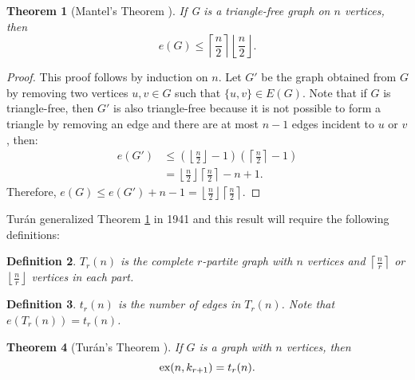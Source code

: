 \documentclass[12pt,twoside,a4paper,bibliography=totocnumbered]{book}
\numberwithin{equation}{section}
\newtheorem{theorem}             {Theorem}[section]
\newtheorem{definition}	[theorem] {Definition}
\theoremstyle{remark}
\def\ex{\mathop{\text{\rm ex}}\nolimits}
\begin{document}
\begin{theorem}[{Mantel's Theorem \cite{Ma07}}]\label{the:mantel}
If G is a triangle-free graph on $n$ vertices, then 
$$e(G) \leq \left\lceil \frac{n}{2} \right\rceil \left\lfloor \frac{n}{2} \right\rfloor .$$
\end{theorem}
\begin{proof}
This proof follows by induction on $n$. Let $G'$ be the graph obtained from $G$ by removing two vertices $u,v \in G$ such that $\{u,v\}\in E(G)$. Note that if $G$ is triangle-free, then $G'$ is also triangle-free because it is not possible to form a triangle by removing an edge and there are at most $n-1$ edges incident to $u$ or $v$, then:
\begin{align*}
e(G') &\leq \left(\left\lfloor \frac{n}{2} \right\rfloor -1\right)\left(\left\lceil \frac{n}{2} \right\rceil -1\right) \\
&= \left\lfloor \frac{n}{2} \right\rfloor \left\lceil \frac{n}{2} \right\rceil - n +1.
\end{align*}
Therefore, $e(G) \leq e(G') + n-1 = \left\lfloor \frac{n}{2} \right\rfloor \left\lceil \frac{n}{2} \right\rceil$. 
\end{proof}

Turán generalized Theorem \ref{the:mantel} in 1941 and this result will require the following definitions: 
\begin{definition}$T_r(n)$ is the complete $r$-partite graph with $n$ vertices and $\left\lceil \frac{n}{r} \right\rceil$ or $\left\lfloor \frac{n}{r} \right\rfloor$ vertices in each part.
\end{definition}

\begin{definition}
$t_r(n)$ is the number of edges in $T_r(n)$. Note that $e(T_r(n)) = t_r(n)$.
\end{definition}

\begin{theorem}[{Turán's Theorem \cite{Tu41}}] \label{theorem:turan1941}%
If $G$ is a graph with $n$ vertices, then $$\ex(n, k_{r+1}) = t_r(n).$$
\end{theorem}
\end{document}
